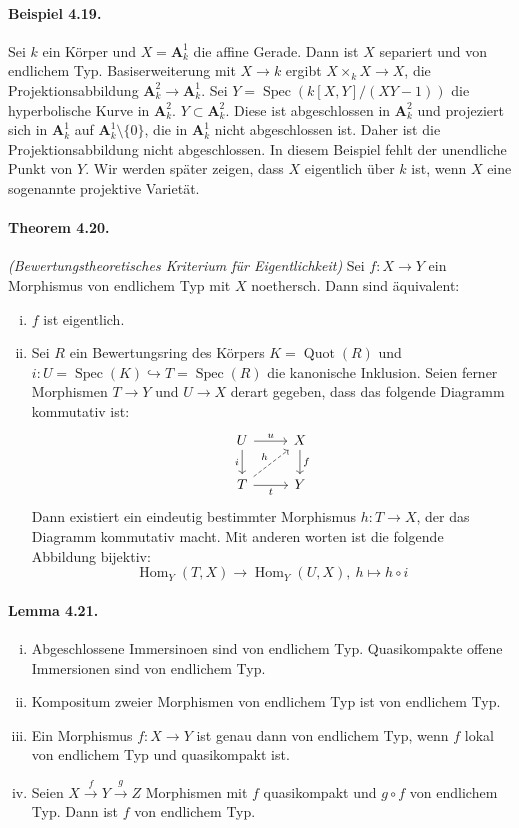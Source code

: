 \documentclass[11pt,b5paper,openany]{memoir}
\begin{document}
\paragraph{Beispiel 4.19.}\label{4.19} Sei $k$ ein Körper und $X=\mathbf{A}_k^1$ die affine Gerade. Dann ist $X$ separiert und von endlichem Typ. Basiserweiterung mit $X\to k$ ergibt $X\times_kX\to X$, die Projektionsabbildung $\mathbf{A}_k^2\to\mathbf{A}_k^1$. Sei $Y=\operatorname{Spec}(k[X,Y]/(XY-1))$ die hyperbolische Kurve in $\mathbf{A}_k^2$. $Y\subset\mathbf{A}_k^2$. Diese ist abgeschlossen in $\mathbf{A}_k^2$ und projeziert sich in $\mathbf{A}_k^1$ auf $\mathbf{A}_k^1\setminus\{0\}$, die in $\mathbf{A}_k^1$ nicht abgeschlossen ist. Daher ist die Projektionsabbildung nicht abgeschlossen. In diesem Beispiel fehlt der unendliche Punkt von $Y$. Wir werden später zeigen, dass $X$ eigentlich über $k$ ist, wenn $X$ eine sogenannte projektive Varietät.

\paragraph{Theorem 4.20.}\label{4.20} \textit{(Bewertungstheoretisches Kriterium für Eigentlichkeit)} Sei $f:X\to Y$ ein Morphismus von endlichem Typ mit $X$ noethersch. Dann sind äquivalent:
\begin{enumerate}[(i)]
\item $f$ ist eigentlich.
\item Sei $R$ ein Bewertungsring des Körpers $K=\operatorname{Quot}(R)$ und $i:U=\operatorname{Spec}(K)\hookrightarrow T=\operatorname{Spec}(R)$ die kanonische Inklusion. Seien ferner Morphismen $T\to Y$ und $U\to X$ derart gegeben, dass das folgende Diagramm kommutativ ist:
\[\begin{tikzcd}
U\ar[r, "u"]\ar[d, "i"'] & X\ar[d, "f"]\\
T\ar[r, "t"']\ar[ru, "h", dashed] & Y
\end{tikzcd}\]
Dann existiert ein eindeutig bestimmter Morphismus $h:T\to X$, der das Diagramm kommutativ macht. Mit anderen worten ist die folgende Abbildung bijektiv:
\[\operatorname{Hom}_Y(T,X)\to\operatorname{Hom}_Y(U,X),\ h\mapsto h\circ i \]
\end{enumerate}

\paragraph{Lemma 4.21.}\label{4.21} \begin{enumerate}[(i)]
\item Abgeschlossene Immersinoen sind von endlichem Typ. Quasikompakte offene Immersionen sind von endlichem Typ.
\item Kompositum zweier Morphismen von endlichem Typ ist von endlichem Typ.
\item Ein Morphismus $f:X\to Y$ ist genau dann von endlichem Typ, wenn $f$ lokal von endlichem Typ und quasikompakt ist.
\item Seien $X\stackrel{f}{\to}Y\stackrel{g}{\to}Z$ Morphismen mit $f$ quasikompakt und $g\circ f$ von endlichem Typ. Dann ist $f$ von endlichem Typ.
\end{enumerate}
\end{document}
